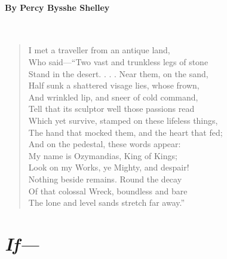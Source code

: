 \documentclass[12pt, openany, letterpaper]{memoir}
\begin{document}
\paragraph{By Percy Bysshe Shelley}~
\begin{verse}
	I met a traveller from an antique land,\\
	Who said—“Two vast and trunkless legs of stone\\
	Stand in the desert. . . . Near them, on the sand,\\
	Half sunk a shattered visage lies, whose frown,\\
	And wrinkled lip, and sneer of cold command,\\
	Tell that its sculptor well those passions read\\
	Which yet survive, stamped on these lifeless things,\\
	The hand that mocked them, and the heart that fed;\\
	And on the pedestal, these words appear:\\
	My name is Ozymandias, King of Kings;\\
	Look on my Works, ye Mighty, and despair!\\
	Nothing beside remains. Round the decay\\
	Of that colossal Wreck, boundless and bare\\
	The lone and level sands stretch far away.”
\end{verse}

\newpage
\section*{\emph{If---}}
\end{document}
